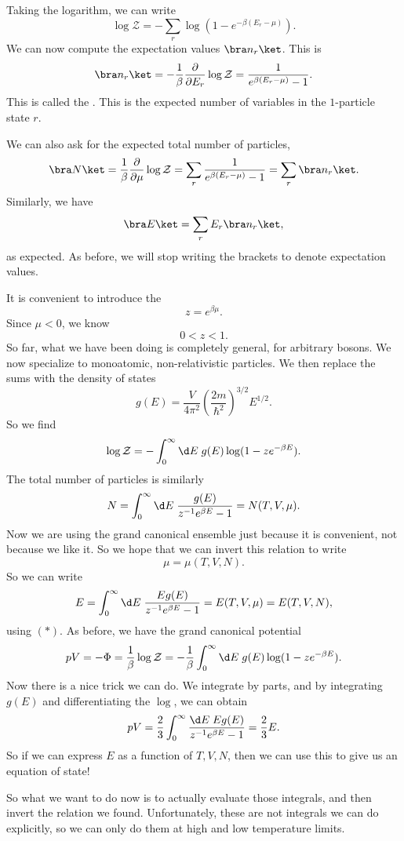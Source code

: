 \documentclass[a4paper]{article}
\begin{document}
Taking the logarithm, we can write
\[
  \log \mathcal{Z} = - \sum_r \log(1 - e^{-\beta (E_r - \mu)}).
\]
We can now compute the expectation values $\bra n_r\ket$. This is
\[
  \bra n_r \ket = - \frac{1}{\beta} \frac{\partial}{\partial E_r} \log \mathcal{Z} = \frac{1}{e^{\beta(E_r - \mu)} - 1}.
\]
This is called the . This is the expected number of variables in the $1$-particle state $r$.

We can also ask for the expected total number of particles,
\[
  \bra N\ket = \frac{1}{\beta} \frac{\partial}{\partial \mu}\log \mathcal{Z} = \sum_r \frac{1}{e^{\beta(E_r - \mu)} - 1} = \sum_r \bra n_r\ket.
\]
Similarly, we have
\[
  \bra E\ket = \sum_r E_r \bra n_r\ket,
\]
as expected. As before, we will stop writing the brackets to denote expectation values.

It is convenient to introduce the 
\[
  z = e^{\beta\mu}.
\]
Since $\mu < 0$, we know
\[
  0 < z < 1.
\]
So far, what we have been doing is completely general, for arbitrary bosons. We now specialize to monoatomic, non-relativistic particles. We then replace the sums with the density of states
\[
  g(E) = \frac{V}{4\pi^2} \left(\frac{2m}{\hbar^2}\right)^{3/2} E^{1/2}.
\]
So we find
\[
  \log \mathcal{Z} = - \int_0^\infty \d E\; g(E) \log (1 - z e^{-\beta E}).
\]
The total number of particles is similarly
\[
  N = \int_0^\infty \d E\; \frac{g(E)}{z^{-1} e^{\beta E} - 1} = N(T, V, \mu).
\]
Now we are using the grand canonical ensemble just because it is convenient, not because we like it. So we hope that we can invert this relation to write %
\[
  \mu = \mu(T, V, N).\tag{$*$}
\]
So we can write
\[
  E = \int_0^\infty \d E\; \frac{E g(E)}{z^{-1} e^{\beta E} - 1} = E(T, V, \mu) = E(T, V, N),
\]
using $(*)$. As before, we have the grand canonical potential
\[
  pV = -\Phi = \frac{1}{\beta} \log \mathcal{Z} = -\frac{1}{\beta} \int_0^\infty \d E\; g(E) \log(1 - ze^{-\beta E}).
\]
Now there is a nice trick we can do. We integrate by parts, and by integrating $g(E)$ and differentiating the $\log$, we can obtain
\[
  pV = \frac{2}{3} \int_0^\infty \frac{\d E\; Eg(E)}{z^{-1} e^{\beta E} - 1} = \frac{2}{3} E.
\]
So if we can express $E$ as a function of $T, V, N$, then we can use this to give us an equation of state!

So what we want to do now is to actually evaluate those integrals, and then invert the relation we found. Unfortunately, these are not integrals we can do explicitly, so we can only do them at high and low temperature limits.
\end{document}
